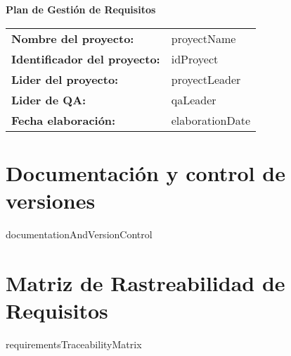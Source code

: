 \documentclass{article}
\begin{document}
    \begin{center}
    {\huge\textbf{Plan de Gestión de Requisitos}}\\[1cm]
    \end{center}

    \renewcommand{\arraystretch}{1.5}

    \begin{tabular}{|ll|} \hline
    \rowcolor{gray!10}\textbf{Nombre del proyecto:} & {{proyectName}} \\[0.3cm]
    \textbf{Identificador del proyecto:} & {{idProyect}} \\[0.3cm]
    \textbf{Lider del proyecto:} & {{proyectLeader}} \\[0.3cm]
    \textbf{Lider de QA:} & {{qaLeader}} \\[0.3cm]
    \textbf{Fecha elaboración:} & {{elaborationDate}} \\ \hline
    \end{tabular}

    \newpage
    
    \tableofcontents
    \newpage
    
    \section{Documentación y control de versiones}
    {{documentationAndVersionControl}}
    
    \section{Matriz de Rastreabilidad de Requisitos}
    {{requirementsTraceabilityMatrix}}
\end{document}
